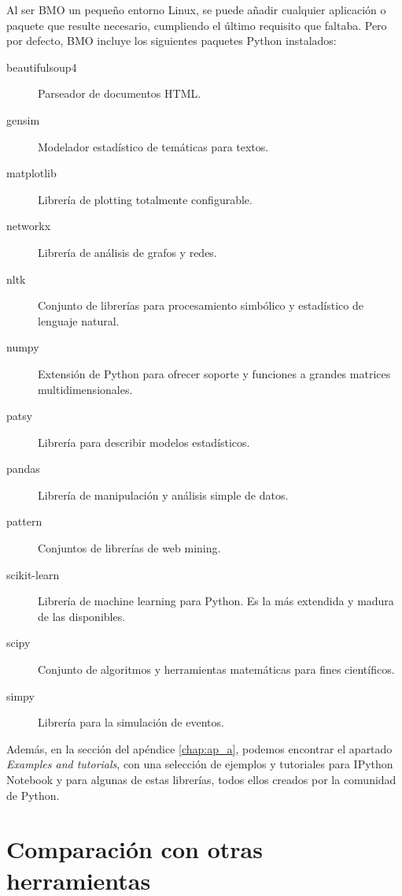 Al ser BMO un pequeño entorno Linux, se puede añadir cualquier aplicación o paquete que resulte necesario, cumpliendo el último requisito que faltaba. Pero por defecto, BMO incluye los siguientes paquetes Python instalados:

\begin{description}
\item[beautifulsoup4] Parseador de documentos HTML.

\item[gensim] Modelador estadístico de temáticas para textos.

\item[matplotlib] Librería de plotting totalmente configurable.

\item[networkx] Librería de análisis de grafos y redes.

\item[nltk] Conjunto de librerías para procesamiento simbólico y estadístico de lenguaje natural.

\item[numpy] Extensión de Python para ofrecer soporte y funciones a grandes matrices multidimensionales.

\item[patsy] Librería para describir modelos estadísticos.

\item[pandas] Librería de manipulación y análisis simple de datos.

\item[pattern] Conjuntos de librerías de web mining.

\item[scikit-learn] Librería de machine learning para Python. Es la más extendida y madura de las disponibles.

\item[scipy] Conjunto de algoritmos y herramientas matemáticas para fines científicos.

\item[simpy] Librería para la simulación de eventos.
\end{description}

Además, en la sección  del apéndice \ref{chap:ap_a}, podemos encontrar el apartado \emph{Examples and tutorials}, con una selección de ejemplos y tutoriales para IPython Notebook y para algunas de estas librerías, todos ellos creados por la comunidad de Python.

\section{Comparación con otras herramientas} \label{sec:4.5}

